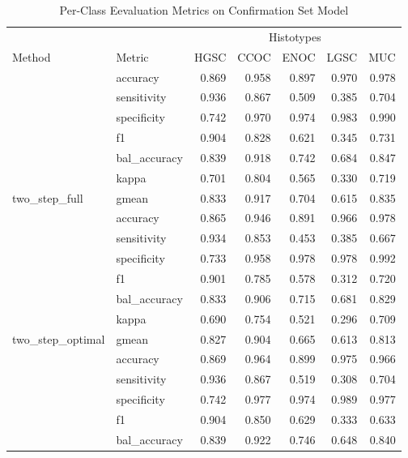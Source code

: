 \documentclass[
]{report}
\begin{document}
\begin{table}

\caption{\label{tab:conf-eval-per-class}Per-Class Eevaluation Metrics on Confirmation Set Model}
\centering
\begin{tabular}[t]{l|l|r|r|r|r|r}
\hline
\multicolumn{2}{c|}{ } & \multicolumn{5}{c}{Histotypes} \\
\cline{3-7}
Method & Metric & HGSC & CCOC & ENOC & LGSC & MUC\\
\hline
 & accuracy & 0.869 & 0.958 & 0.897 & 0.970 & 0.978\\
\cline{2-7}
 & sensitivity & 0.936 & 0.867 & 0.509 & 0.385 & 0.704\\
\cline{2-7}
 & specificity & 0.742 & 0.970 & 0.974 & 0.983 & 0.990\\
\cline{2-7}
 & f1 & 0.904 & 0.828 & 0.621 & 0.345 & 0.731\\
\cline{2-7}
 & bal\_accuracy & 0.839 & 0.918 & 0.742 & 0.684 & 0.847\\
\cline{2-7}
 & kappa & 0.701 & 0.804 & 0.565 & 0.330 & 0.719\\
\cline{2-7}
\multirow{-7}{*}{\raggedright\arraybackslash two\_step\_full} & gmean & 0.833 & 0.917 & 0.704 & 0.615 & 0.835\\
\cline{1-7}
 & accuracy & 0.865 & 0.946 & 0.891 & 0.966 & 0.978\\
\cline{2-7}
 & sensitivity & 0.934 & 0.853 & 0.453 & 0.385 & 0.667\\
\cline{2-7}
 & specificity & 0.733 & 0.958 & 0.978 & 0.978 & 0.992\\
\cline{2-7}
 & f1 & 0.901 & 0.785 & 0.578 & 0.312 & 0.720\\
\cline{2-7}
 & bal\_accuracy & 0.833 & 0.906 & 0.715 & 0.681 & 0.829\\
\cline{2-7}
 & kappa & 0.690 & 0.754 & 0.521 & 0.296 & 0.709\\
\cline{2-7}
\multirow{-7}{*}{\raggedright\arraybackslash two\_step\_optimal} & gmean & 0.827 & 0.904 & 0.665 & 0.613 & 0.813\\
\cline{1-7}
 & accuracy & 0.869 & 0.964 & 0.899 & 0.975 & 0.966\\
\cline{2-7}
 & sensitivity & 0.936 & 0.867 & 0.519 & 0.308 & 0.704\\
\cline{2-7}
 & specificity & 0.742 & 0.977 & 0.974 & 0.989 & 0.977\\
\cline{2-7}
 & f1 & 0.904 & 0.850 & 0.629 & 0.333 & 0.633\\
\cline{2-7}
 & bal\_accuracy & 0.839 & 0.922 & 0.746 & 0.648 & 0.840\\

\end{tabular}
\end{table}
\end{document}
